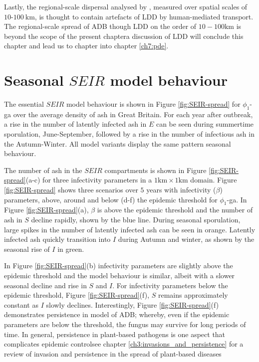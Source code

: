 Lastly, the regional-scale dispersal analysed by \cite{grosdidier2018tracking}, measured over spatial scales of $10$-$100\ \mathrm{km}$, is thought to contain artefacts of LDD by human-mediated transport.
The regional-scale spread of ADB though LDD on the order of $10-100\mathrm{km}$ is beyond the scope of the present chapter\textemdash a discussion of LDD will conclude this chapter and lead us to chapter into chapter \ref{ch7:pde}.

\section{Seasonal $SEIR$ model behaviour}

The essential $SEIR$ model behaviour is shown in Figure \ref{fig:SEIR-spread} for $\phi_1$-ga over the average density of ash in Great Britain.
For each year after outbreak, a rise in the number of latently infected ash in $E$ can be seen during summertime sporulation, June-September, followed by a rise in the number of infectious ash in the Autumn-Winter. 
All model variants display the same pattern seasonal behaviour. 

The number of ash in the $SEIR$ compartments is shown in Figure \ref{fig:SEIR-spread}(a-c) for three infectivity parameters in a $1\mathrm{km}\times1\mathrm{km}$ domain.
Figure \ref{fig:SEIR-spread} shows three scenarios over $5$ years with infectivity ($\beta$) parameters, above, around and below (d-f) the epidemic threshold for $\phi_1$-ga.
In Figure \ref{fig:SEIR-spread}(a), $\beta$ is above the epidemic threshold and the number of ash in $S$ decline rapidly, shown by the blue line. 
During seasonal sporulation, large spikes in the number of latently infected ash can be seen in orange. 
Latently infected ash quickly transition into $I$ during Autumn and winter, as shown by the seasonal rise of $I$ in green.

In Figure \ref{fig:SEIR-spread}(b) infectivity parameters are slightly above the epidemic threshold and the model behaviour is similar, albeit with a slower seasonal decline and rise in $S$ and $I$.
For infectivity parameters below the epidemic threshold, Figure \ref{fig:SEIR-spread}(f), $S$ remains approximately constant as $I$ slowly declines. 
Interestingly, Figure \ref{fig:SEIR-spread}(f) demonstrates persistence in model of ADB; 
whereby, even if the epidemic parameters are below the threshold, the fungus may survive for long periods of time. 
In general, persistence in plant-based pathogens is one aspect that complicates epidemic control\textemdash see chapter \ref{ch3:invasions_and_persistence} for a review of invasion and persistence in the spread of plant-based diseases

